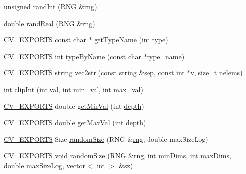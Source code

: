 \begin{DoxyCompactItemize}
\item 
unsigned \hyperlink{namespacecvtest_a26cc57bf4a8d91168ad8e371644506bc}{rand\-Int} (R\-N\-G \&\hyperlink{core__c_8h_a8d3f239dca9d5c72c8a66d7a1c142efd}{rng})
\item 
double \hyperlink{namespacecvtest_a9639bfa71aa22e5763f66cd4c0bb1533}{rand\-Real} (R\-N\-G \&\hyperlink{core__c_8h_a8d3f239dca9d5c72c8a66d7a1c142efd}{rng})
\item 
\hyperlink{core_2types__c_8h_a1bf9f0e121b54272da02379cfccd0a2b}{C\-V\-\_\-\-E\-X\-P\-O\-R\-T\-S} const char $\ast$ \hyperlink{namespacecvtest_a6976036fa96fda433ab30aac85585c1e}{get\-Type\-Name} (int \hyperlink{imgproc__c_8h_a84612d8738bf935200cf32a103d8efe1}{type})
\item 
\hyperlink{core_2types__c_8h_a1bf9f0e121b54272da02379cfccd0a2b}{C\-V\-\_\-\-E\-X\-P\-O\-R\-T\-S} int \hyperlink{namespacecvtest_aa761fe30295aeb4e1a0a836301200319}{type\-By\-Name} (const char $\ast$type\-\_\-name)
\item 
\hyperlink{core_2types__c_8h_a1bf9f0e121b54272da02379cfccd0a2b}{C\-V\-\_\-\-E\-X\-P\-O\-R\-T\-S} string \hyperlink{namespacecvtest_acd977ea496ae0145582b4ca2172dd46f}{vec2str} (const string \&sep, const int $\ast$v, size\-\_\-t nelems)
\item 
int \hyperlink{namespacecvtest_a58f2a5f3a78076f6b287adf539c08a35}{clip\-Int} (int val, int \hyperlink{core__c_8h_a2c60d4e453921f07a407a647c96e8316}{min\-\_\-val}, int \hyperlink{core__c_8h_a928495205a5ca34548c11042d48d733b}{max\-\_\-val})
\item 
\hyperlink{core_2types__c_8h_a1bf9f0e121b54272da02379cfccd0a2b}{C\-V\-\_\-\-E\-X\-P\-O\-R\-T\-S} double \hyperlink{namespacecvtest_aae60ea3df2f2a5880f0b37d58e09054c}{get\-Min\-Val} (int \hyperlink{core__c_8h_acb5ba97551079e0b072c62c21d784ac5}{depth})
\item 
\hyperlink{core_2types__c_8h_a1bf9f0e121b54272da02379cfccd0a2b}{C\-V\-\_\-\-E\-X\-P\-O\-R\-T\-S} double \hyperlink{namespacecvtest_aef7feb873a9078fa8343822014120dfd}{get\-Max\-Val} (int \hyperlink{core__c_8h_acb5ba97551079e0b072c62c21d784ac5}{depth})
\item 
\hyperlink{core_2types__c_8h_a1bf9f0e121b54272da02379cfccd0a2b}{C\-V\-\_\-\-E\-X\-P\-O\-R\-T\-S} Size \hyperlink{namespacecvtest_a6bc34c509892c3ba1adba15ee9f3992f}{random\-Size} (R\-N\-G \&\hyperlink{core__c_8h_a8d3f239dca9d5c72c8a66d7a1c142efd}{rng}, double max\-Size\-Log)
\item 
\hyperlink{core_2types__c_8h_a1bf9f0e121b54272da02379cfccd0a2b}{C\-V\-\_\-\-E\-X\-P\-O\-R\-T\-S} \hyperlink{legacy_8hpp_a8bb47f092d473522721002c86c13b94e}{void} \hyperlink{namespacecvtest_a219e0cb0744cd51b22891584f17e026d}{random\-Size} (R\-N\-G \&\hyperlink{core__c_8h_a8d3f239dca9d5c72c8a66d7a1c142efd}{rng}, int min\-Dims, int max\-Dims, double max\-Size\-Log, vector$<$ int $>$ \&sz)

\end{DoxyCompactItemize}
